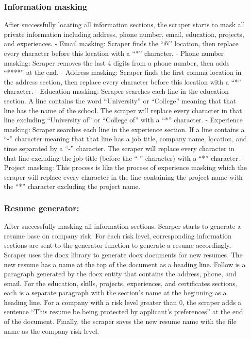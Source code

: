 \documentclass{article}
\begin{document}
\subsubsection{Information masking}
After successfully locating all information sections, the scraper starts to mask all private information including address, phone number, email, education, projects, and experiences.
-	Email masking: Scraper finds the “@” location, then replace every character before this location with a “*” character.
-	Phone number masking: Scraper removes the last 4 digits from a phone number, then adds “****” at the end.
-	Address masking: Scraper finds the first comma location in the address section, then replace every character before this location with a “*” character.
-	Education masking: Scraper searches each line in the education section. A line contains the word “University” or “College” meaning that that line has the name of the school. The scraper will replace every character in that line excluding “University of” or “College of” with a “*” character.
-	Experience masking: Scraper searches each line in the experience section. If a line contains a “-” character meaning that that line has a job title, company name, location, and time separated by a “-” character. The scraper will replace every character in that line excluding the job title (before the “-” character) with a “*” character.
-	Project masking: This process is like the process of experience masking which the scraper will replace every character in the line containing the project name with the “*” character excluding the project name.
\subsubsection{Resume generator:  }
After successfully masking all information sections. Scarper starts to generate a resume base on company risk. For each risk level, corresponding information sections are sent to the generator function to generate a resume accordingly. Scraper uses the docx library to generate docx documents for new resumes. The new resume has a name at the top of the document as a heading line. Follow is a paragraph generated by the docx entity that contains the address, phone, and email. For the education, skills, projects, experiences, and certificates sections, each is a separate paragraph with the section’s name at the beginning as a heading line. For a company with a risk level greater than 0, the scraper adds a sentence “This resume be being protected by applicant’s preferences” at the end of the document. Finally, the scraper saves the new resume name with the file name as the company risk level.
\end{document}

